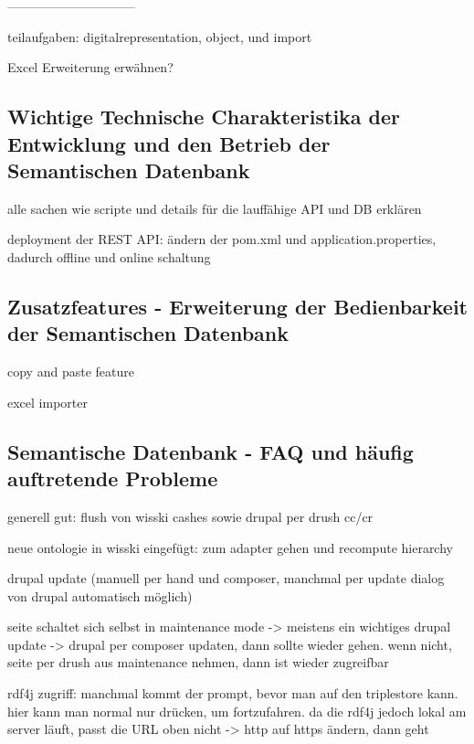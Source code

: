 ------------------------------

teilaufgaben: digitalrepresentation, object, und import

Excel Erweiterung erwähnen?

\subsection{Wichtige Technische Charakteristika der Entwicklung und den Betrieb der Semantischen Datenbank}\label{sec:features}

alle sachen wie scripte und details für die lauffähige API und DB erklären 

deployment der REST API: ändern der pom.xml und application.properties, dadurch offline und online schaltung

\subsection{Zusatzfeatures - Erweiterung der Bedienbarkeit der Semantischen Datenbank}\label{sec:additional_features}

copy and paste feature

excel importer

\subsection{Semantische Datenbank - FAQ und häufig auftretende Probleme}\label{sec:faqSW}

generell gut: flush von wisski cashes sowie drupal per drush cc/cr

neue ontologie in wisski eingefügt: zum adapter gehen und recompute hierarchy

drupal update (manuell per hand und composer, manchmal per update dialog von drupal automatisch möglich)

seite schaltet sich selbst in maintenance mode -> meistens ein wichtiges drupal update -> drupal per composer updaten, dann sollte wieder gehen. wenn nicht, seite per drush aus maintenance nehmen, dann ist wieder zugreifbar

rdf4j zugriff: manchmal kommt der  prompt, bevor man auf den triplestore kann. hier kann man normal nur  drücken, um fortzufahren. da die rdf4j jedoch lokal am server läuft, passt die URL oben nicht -> http auf https ändern, dann geht









